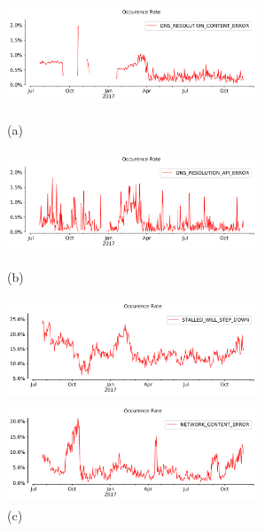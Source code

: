\begin{figure}[!ht]
	\begin{minipage}{0.5\textwidth}
		\centering
		\includegraphics[keepaspectratio, height=3cm, width=7.5cm]{figures/errors/netflix-occurence-rate-dns-content.pdf}
		\caption[Occurrence Rate DNS Resolution Content Error]{(a)}
		\label{fig:Occurrence Rate DNS Resolution Content Error}
	\end{minipage}
	\begin{minipage}{0.50\textwidth}
		\centering
		\includegraphics[keepaspectratio, height=3cm, width=7.5cm]{figures/errors/netflix-occurence-rate-dns-api.pdf}
		\caption[Occurrence Rate DNS Resolution API Error]{(b)}
		\label{fig:Occurrence Rate DNS Resolution API Error}
	\end{minipage}
	\begin{minipage}{0.5\textwidth}
		\centering
		\includegraphics[keepaspectratio, height=3cm, width=7.5cm]{figures/errors/netflix-occurence-rate-stalled-will.pdf}
		\caption[Occurrence Rate Stalled Will Step Down Error]{(c)}
		\label{fig:Occurrence Rate Stalled Will Step Down Error}
	\end{minipage}
	\begin{minipage}{0.5\textwidth}
		\centering
		\includegraphics[keepaspectratio, height=3cm, width=7.5cm]{figures/errors/netflix-occurence-rate-network-content.pdf}

\end{minipage}
\end{figure}
